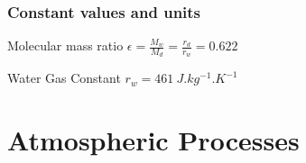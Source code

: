 \documentclass[10pt]{article}
\begin{document}
\begin{multicols}{3}
\subsubsection{Constant values and units}
%
\begin{ttdesc}[labelwidth=\widthof{\ttfamily{letterpaper/a4paper}}]
\item[Molecular mass ratio] $\epsilon = \frac{M_w}{M_d}=\frac {r_{d}}{r_{w}}=0.622$
\item[Water Gas Constant] $r_w = \SI{461}{J.kg^{-1}.K^{-1}}$
\end{ttdesc}

%

\section{Atmospheric Processes}


\end{multicols}
\end{document}
